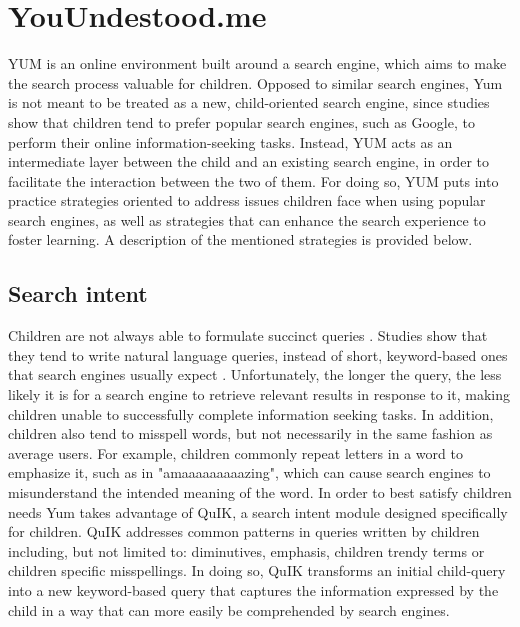 \documentclass{sig-alternate-05-2015}
\begin{document}
\section{YouUndestood.me}
YUM is an online environment built around a search engine, which aims to make the search process valuable for children. Opposed to similar search engines\cite{Ust14}, Yum is not meant to be treated as a new, child-oriented search engine, since studies \cite{ref} show that children tend to prefer popular search engines, such as Google, to perform their online information-seeking tasks. Instead, YUM acts as an intermediate layer between the child and an existing search engine, in order to facilitate the interaction between the two of them. For doing so, YUM puts into practice strategies oriented to address issues children face when using popular search engines, as well as strategies that can enhance the search experience to foster learning.  A description of the mentioned strategies is provided below.

\subsection{Search intent}
Children are not always able to formulate succinct queries \cite{Bil11}. Studies show that they tend to write natural language queries, instead of short, keyword-based ones that search engines usually expect \cite{Dru09}. Unfortunately, the longer the query, the less likely it is for a  search engine to retrieve relevant results in response to it, making children unable to successfully complete information seeking tasks\cite{Dru09}. In addition, children also tend to misspell words, but not necessarily in the same fashion as average users. For example, children commonly repeat letters in a word to emphasize it, such as in "amaaaaaaaaazing", which can cause search engines to misunderstand the intended meaning of the word. In order to best satisfy children needs Yum takes advantage of QuIK\cite{Sven}, a search intent module designed specifically  for children. QuIK addresses common patterns in queries written by children including, but not limited to: diminutives, emphasis, children trendy terms or children specific misspellings. In doing so, QuIK transforms an initial child-query into a new keyword-based query that captures the information expressed by the child in a way that can more easily be comprehended by search engines.
\end{document}
